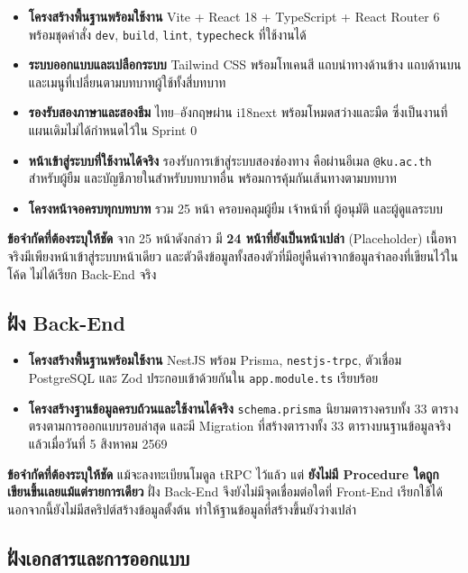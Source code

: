 \begin{itemize}
  \item \textbf{โครงสร้างพื้นฐานพร้อมใช้งาน} Vite + React 18 + TypeScript + React Router 6 พร้อมชุดคำสั่ง \texttt{dev}, \texttt{build}, \texttt{lint}, \texttt{typecheck} ที่ใช้งานได้
  \item \textbf{ระบบออกแบบและเปลือกระบบ} Tailwind CSS พร้อมโทเคนสี แถบนำทางด้านข้าง แถบด้านบน และเมนูที่เปลี่ยนตามบทบาทผู้ใช้ทั้งสี่บทบาท
  \item \textbf{รองรับสองภาษาและสองธีม} ไทย–อังกฤษผ่าน i18next พร้อมโหมดสว่างและมืด ซึ่งเป็นงานที่แผนเดิมไม่ได้กำหนดไว้ใน Sprint 0
  \item \textbf{หน้าเข้าสู่ระบบที่ใช้งานได้จริง} รองรับการเข้าสู่ระบบสองช่องทาง คือผ่านอีเมล \texttt{@ku.ac.th} สำหรับผู้ยืม และบัญชีภายในสำหรับบทบาทอื่น พร้อมการคุ้มกันเส้นทางตามบทบาท
  \item \textbf{โครงหน้าจอครบทุกบทบาท} รวม 25 หน้า ครอบคลุมผู้ยืม เจ้าหน้าที่ ผู้อนุมัติ และผู้ดูแลระบบ
\end{itemize}

\noindent\textbf{ข้อจำกัดที่ต้องระบุให้ชัด} จาก 25 หน้าดังกล่าว มี \textbf{24 หน้าที่ยังเป็นหน้าเปล่า} (Placeholder) เนื้อหาจริงมีเพียงหน้าเข้าสู่ระบบหน้าเดียว และตัวดึงข้อมูลทั้งสองตัวที่มีอยู่คืนค่าจากข้อมูลจำลองที่เขียนไว้ในโค้ด ไม่ได้เรียก Back-End จริง

\subsection{ฝั่ง Back-End}

\begin{itemize}
  \item \textbf{โครงสร้างพื้นฐานพร้อมใช้งาน} NestJS พร้อม Prisma, \texttt{nestjs-trpc}, ตัวเชื่อม PostgreSQL และ Zod ประกอบเข้าด้วยกันใน \texttt{app.module.ts} เรียบร้อย
  \item \textbf{โครงสร้างฐานข้อมูลครบถ้วนและใช้งานได้จริง} \texttt{schema.prisma} นิยามตารางครบทั้ง 33 ตารางตรงตามการออกแบบรอบล่าสุด และมี Migration ที่สร้างตารางทั้ง 33 ตารางบนฐานข้อมูลจริงแล้วเมื่อวันที่ 5 สิงหาคม 2569
\end{itemize}

\noindent\textbf{ข้อจำกัดที่ต้องระบุให้ชัด} แม้จะลงทะเบียนโมดูล tRPC ไว้แล้ว แต่ \textbf{ยังไม่มี Procedure ใดถูกเขียนขึ้นเลยแม้แต่รายการเดียว} ฝั่ง Back-End จึงยังไม่มีจุดเชื่อมต่อใดที่ Front-End เรียกใช้ได้ นอกจากนี้ยังไม่มีสคริปต์สร้างข้อมูลตั้งต้น ทำให้ฐานข้อมูลที่สร้างขึ้นยังว่างเปล่า

\subsection{ฝั่งเอกสารและการออกแบบ}

